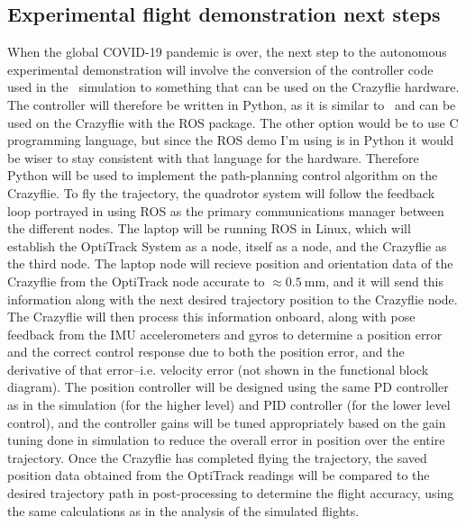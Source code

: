 \subsection{Experimental flight demonstration next steps}
When the global COVID-19 pandemic is over, the next step to the autonomous experimental demonstration will involve the conversion of the controller code used in the \MATLAB\ simulation to something that can be used on the Crazyflie hardware. The controller will therefore be written in Python, as it is similar to \MATLAB\ and can be used on the Crazyflie with the ROS package. The other option would be to use C programming language, but since the ROS demo I'm using is in Python it would be wiser to stay consistent with that language for the hardware. Therefore Python will be used to implement the path-planning control algorithm on the Crazyflie. To fly the trajectory, the quadrotor system will follow the feedback loop portrayed in  using ROS as the primary communications manager between the different nodes. The laptop will be running ROS in Linux, which will establish the OptiTrack System as a node, itself as a node, and the Crazyflie as the third node. The laptop node will recieve position and orientation data of the Crazyflie from the OptiTrack node accurate to $\approx \SI{0.5}{\milli\meter}$, and it will send this information along with the next desired trajectory position to the Crazyflie node. The Crazyflie will then process this information onboard, along with pose feedback from the IMU accelerometers and gyros to determine a position error and the correct control response due to both the position error, and the derivative of that error--i.e. velocity error (not shown in the functional block diagram). The position controller will be designed using the same PD controller as in the simulation (for the higher level) and PID controller (for the lower level control), and the controller gains will be tuned appropriately based on the gain tuning done in simulation to reduce the overall error in position over the entire trajectory. Once the Crazyflie has completed flying the trajectory, the saved position data obtained from the OptiTrack readings will be compared to the desired trajectory path in post-processing to determine the flight accuracy, using the same calculations as in the analysis of the simulated flights.





